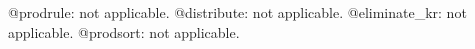 \documentclass[11pt]{article}
\begin{document}
\begin{dmath*}[compact, spread=2pt]
\end{dmath*}
@prodrule: not applicable.
@distribute: not applicable.
@eliminate\_kr: not applicable.
@prodsort: not applicable.
\end{document}
